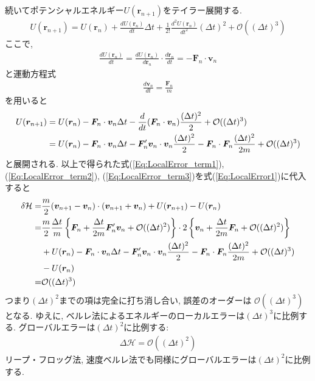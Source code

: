 続いてポテンシャルエネルギー$U(\bm{r}_{n+1})$をテイラー展開する.
\begin{align}
  U(\bm{r}_{n+1})
=
  U(\bm{r}_{n})
+ \frac{d U(\bm{r}_{n})}{dt} \Delta t
+ \frac{1}{2!} \frac{d^{2} U(\bm{r}_{n})}{dt^{2}} (\Delta t)^{2}
+ \mathcal{O}((\Delta t)^{3})
\end{align}
ここで, 
\begin{align}
  \frac{d U(\bm{r}_{n})}{dt}
= \frac{d U(\bm{r}_{n})}{d \bm{r}_{n}} \cdot \frac{d \bm{r}_{n}}{d t} 
= -\bm{F}_{n} \cdot \bm{v}_{n}
\end{align}
と運動方程式
\begin{align}
 \frac{d \bm{v}_{n}}{dt} = \frac{\bm{F}_{n}}{m}
\end{align}
を用いると
\begin{align}
   U(\bm{r}_{n+1})
&=
   U(\bm{r}_{n})
 - \bm{F}_{n} \cdot \bm{v}_{n} \Delta t
 - \frac{d}{dt}(\bm{F}_{n} \cdot \bm{v}_{n}) \frac{(\Delta t)^{2}}{2}
 + \mathcal{O}((\Delta t)^{3})
 \notag
 \\
&=
   U(\bm{r}_{n})
 - \bm{F}_{n} \cdot \bm{v}_{n} \Delta t
 - \bm{F}_{n}^{\prime} \bm{v}_{n} \cdot \bm{v}_{n} \frac{(\Delta t)^{2}}{2}
 - \bm{F}_{n} \cdot \bm{F}_{n} \frac{(\Delta t)^{2}}{2m}
 + \mathcal{O}((\Delta t)^{3})
 \label{Eq:LocalError_term3}
\end{align}
と展開される. 
以上で得られた式(\ref{Eq:LocalError_term1}), (\ref{Eq:LocalError_term2}), 
(\ref{Eq:LocalError_term3})を式(\ref{Eq:LocalError1})に代入すると
\begin{align}
    \delta \mathcal{H}
=&
   \frac{m}{2}(\bm{v}_{n+1} - \bm{v}_{n}) \cdot (\bm{v}_{n+1} + \bm{v}_{n})
  + U(\bm{r}_{n+1}) - U(\bm{r}_{n})
  \notag
  \\
=&
  \frac{m}{2}
  \frac{\Delta t}{m} 
  \left\{
          \bm{F}_{n} 
        + \frac{\Delta t}{2m} \bm{F}_{n}^{\prime} \bm{v}_{n}
        + \mathcal{O}((\Delta t)^{2})
  \right\}
  \cdot
     2 \left\{
             \bm{v}_{n} + \frac{\Delta t}{2m} \bm{F}_{n} 
           + \mathcal{O}((\Delta t)^{2})
     \right\}
 \notag
 \\
&+
   U(\bm{r}_{n})
 - \bm{F}_{n} \cdot \bm{v}_{n} \Delta t
 - \bm{F}_{n}^{\prime} \bm{v}_{n} \cdot \bm{v}_{n} \frac{(\Delta t)^{2}}{2}
 - \bm{F}_{n} \cdot \bm{F}_{n} \frac{(\Delta t)^{2}}{2m}
 + \mathcal{O}((\Delta t)^{3})
 \notag
 \\
&-
   U(\bm{r}_{n})
 \notag
 \\
=&
 \mathcal{O}((\Delta t)^{3})
\end{align}
つまり$(\Delta t)^{2}$までの項は完全に打ち消し合い, 誤差のオーダーは
$\mathcal{O}((\Delta t)^{3})$となる.
ゆえに, ベルレ法によるエネルギーのローカルエラーは$(\Delta t)^{3}$に比例する.
グローバルエラーは$(\Delta t)^{2}$に比例する:
\begin{align}
 \Delta \mathcal{H} = \mathcal{O}((\Delta t)^{2})
\end{align}
リープ・フロッグ法, 速度ベルレ法でも同様にグローバルエラーは$(\Delta t)^{2}$に比例する.


